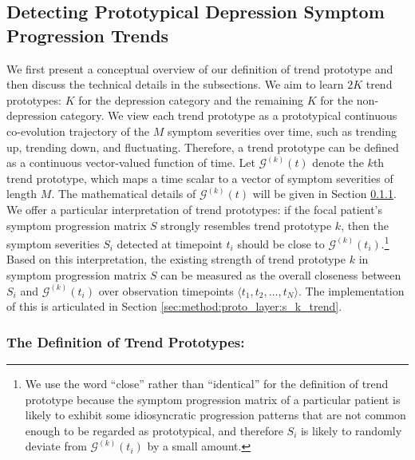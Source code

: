 \documentclass[mnsc]{informs3b} %
\begin{document}
\subsection{Detecting Prototypical Depression Symptom Progression Trends} \label{sec:method:trend}


We first present a conceptual overview of our definition of trend prototype and then discuss the technical details in the subsections.
We aim to learn $2K$ trend prototypes: $K$ for the depression category and the remaining $K$ for the non-depression category. 
We view each trend prototype as a prototypical continuous co-evolution trajectory of the $M$ symptom severities over time, such as trending up, trending down, and fluctuating. Therefore, a trend prototype can be defined as a continuous vector-valued function of time.
Let $\mathcal{G}^{(k)}(t)$ denote the $k$th trend prototype, which maps a time scalar to a vector of symptom severities of length $M$. 
The mathematical details of $\mathcal{G}^{(k)}(t)$ will be given in Section \ref{sec:method:proto_layer:g_k_trend}.
We offer a particular interpretation of trend prototypes: if the focal patient's symptom progression matrix $S$ strongly resembles trend prototype $k$, then the symptom severities $S_i$ detected at timepoint $t_i$ should be close to $\mathcal{G}^{(k)}(t_i)$.\footnote{We use the word ``close'' rather than ``identical'' for the definition of trend prototype because the symptom progression matrix of a particular patient is likely to exhibit some idiosyncratic progression patterns that are not common enough to be regarded as prototypical, and therefore $S_i$ is likely to randomly deviate from $\mathcal{G}^{(k)}(t_i)$ by a small amount.} Based on this interpretation, the existing strength of trend prototype $k$ in symptom progression matrix $S$ can be measured as the overall closeness between $S_i$ and $\mathcal{G}^{(k)}(t_i)$ over observation timepoints $\langle t_1, t_2, \dots, t_{N} \rangle$. The implementation of this is articulated in Section \ref{sec:method:proto_layer:s_k_trend}.


\subsubsection{The Definition of Trend Prototypes:} \label{sec:method:proto_layer:g_k_trend}
\end{document}
